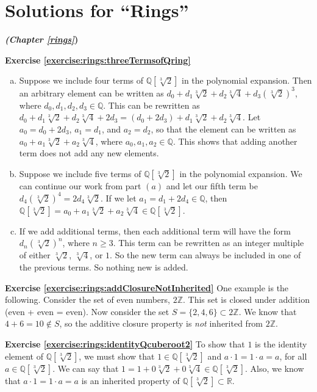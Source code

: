 
\section{Solutions for ``Rings''}
\noindent\textbf{\textit{ (Chapter \ref{rings}})}\bigskip

\noindent\textbf{Exercise \ref{exercise:rings:threeTermsofQring}}
\begin{enumerate}[(a)]
\item Suppose we include four terms of ${\mathbb Q}[\sqrt[3]{2}]$ in the polynomial expansion.  Then an arbitrary element can be written as $d_0+d_1\sqrt[3]{2}+d_2\sqrt[3]{4}+d_3(\sqrt[3]{2})^3$, where $d_0,d_1,d_2,d_3\in{\mathbb Q}$. This can be rewritten as $d_0+d_1\sqrt[3]{2}+d_2\sqrt[3]{4}+2d_3=(d_0+2d_3)+d_1\sqrt[3]{2}+d_2\sqrt[3]{4}$.  Let $a_0=d_0+2d_3$, $a_1=d_1$, and $a_2=d_2$, so that the element can be written as $a_0+a_1\sqrt[3]{2}+a_2\sqrt[3]{4}$, where $a_0,a_1,a_2\in {\mathbb Q}$.  This shows that adding another term does not add any new elements.
\item Suppose we include five terms of ${\mathbb Q}[\sqrt[3]{2}]$ in the polynomial expansion.  We can continue our work from part $(a)$ and let our fifth term be $d_4(\sqrt[3]{2})^4=2d_4\sqrt[3]{2}$.  If we let $a_1=d_1+2d_4\in{\mathbb Q}$, then ${\mathbb Q}[\sqrt[3]{2}]=a_0+a_1\sqrt[3]{2}+a_2\sqrt[3]{4}\in{\mathbb Q}[\sqrt[3]{2}]$.
\item If we add additional terms, then each additional term will have the form $d_n(\sqrt[3]{2})^n$, where $n\ge 3$.  This term can be rewritten as an integer multiple of either $\sqrt[3]{2}$, $\sqrt[3]{4}$, or $1$.  So the new term can always be included in one of the previous terms. So nothing new is added.
\end{enumerate}

\noindent\textbf{Exercise \ref{exercise:rings:addClosureNotInherited}}
One example is the following. Consider the set of even numbers, $2{\mathbb Z}$.  This set is closed under addition (even + even = even).  Now consider the set $S=\{2,4,6\}\subset 2{\mathbb Z}$.  We know that $4+6=10\notin S$, so the additive closure property is \emph{not} inherited from $2{\mathbb Z}$.

\noindent\textbf{Exercise \ref{exercise:rings:identityQcuberoot2}}
To show that $1$ is the identity element of ${\mathbb Q}[\sqrt[3]{2}]$, we must show that $1\in{\mathbb Q}[\sqrt[3]{2}]$ and $a\cdot 1=1\cdot a=a$, for all $a\in{\mathbb Q}[\sqrt[3]{2}]$. We can say that $1=1+0\sqrt[3]{2}+0\sqrt[3]{4}\in{\mathbb Q}[\sqrt[3]{2}]$. Also, we know that  $a\cdot1=1\cdot a=a$ is an inherited property of ${\mathbb Q}[\sqrt[3]{2}]\subset{\mathbb R}$.

